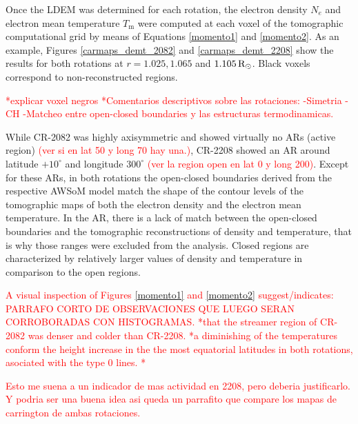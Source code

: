 \documentclass[namedreferences]{solarphysics}
\newcommand{\mdeg}{^\circ}
\newcommand{\mrsun}{{\rm R_\odot}}
\begin{document}
\begin{article}
Once the LDEM was determined for each rotation, the electron density $N_e$ and electron mean temperature $T_\textrm{m}$ were computed at each voxel of the tomographic computational grid by means of Equations \ref{momento1} and \ref{momento2}. As an example, Figures \ref{carmaps_demt_2082} and \ref{carmaps_demt_2208} show the results for both rotations at $r=1.025, 1.065$ and $1.105\,\mrsun$. Black voxels correspond to non-reconstructed regions.

\textcolor{red}{
*explicar voxel negros
*Comentarios descriptivos sobre las rotaciones:
-Simetria
-CH
-Matcheo entre open-closed boundaries y las estructuras termodinamicas.
}


While CR-2082 was highly axisymmetric and showed virtually no ARs (active region) \textcolor{red}{(ver si en lat 50 y long 70 hay una.)}, CR-2208 showed an AR around latitude $+10\mdeg$ and longitude $300\mdeg$ \textcolor{red}{(ver la region open en lat 0 y long 200)}. Except for these ARs, in both rotations the open-closed boundaries derived from the respective AWSoM model match the shape of the contour levels of the tomographic maps of both the electron density and the electron mean temperature. In the AR, there is a lack of match between the open-closed boundaries and the tomographic reconstructions of density and temperature, that is why those ranges were excluded from the analysis. Closed regions are characterized by relatively larger values of density and temperature in comparison to the open regions.

\textcolor{red}{A visual inspection of Figures \ref{momento1} and \ref{momento2} suggest/indicates:
PARRAFO CORTO DE OBSERVACIONES QUE LUEGO SERAN CORROBORADAS CON HISTOGRAMAS.
*that the streamer region of CR-2082 was denser and colder than CR-2208. 
*a diminishing of the temperatures conform the height increase in the the most equatorial latitudes in both rotations, asociated with the type 0 lines.
*}

\textcolor{red}{Esto me suena a un indicador de mas actividad en 2208, pero deberia justificarlo. Y podria ser una buena idea asi queda un parrafito que compare los mapas de carrington de ambas rotaciones.}


\end{article}
\end{document}
